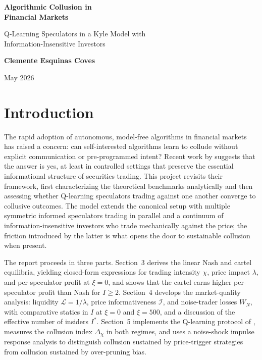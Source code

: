 \documentclass[11pt]{article}
\begin{document}
\begin{titlepage}
    \centering
    \vspace*{6cm}
    
    {\Huge\bfseries Algorithmic Collusion in\\Financial Markets\par}
    \vspace{1cm}
    
    {\Large Q-Learning Speculators in a Kyle Model with\\Information-Insensitive Investors\par}
    \vspace{5cm}
    
    {\Large\bfseries Clemente Esquinas Coves\par}
    \vspace{0.5cm}
    
    {\large May 2026\par}
    
    \vfill
    
\end{titlepage}


\section{Introduction}

The rapid adoption of autonomous, model-free algorithms in financial
markets has raised a concern: can self-interested algorithms
learn to collude without explicit communication or pre-programmed
intent? Recent work by \citet{Dou2025} suggests that the answer is yes, at
least in controlled settings that preserve the essential
informational structure of securities trading. This project revisits
their framework, first characterizing the theoretical benchmarks
analytically and then assessing whether Q-learning speculators trading
against one another converge to collusive outcomes. The model extends
the canonical \citet{Kyle1985} setup with multiple symmetric informed
speculators trading in parallel and a continuum of
information-insensitive investors who trade mechanically against the
price; the friction introduced by the latter is what opens the door to
sustainable collusion when present.

The report proceeds in three parts. Section~3 derives the linear Nash
and cartel equilibria, yielding closed-form expressions for trading
intensity $\chi$, price impact $\lambda$, and per-speculator profit at
$\xi = 0$, and shows that the cartel earns higher per-speculator profit
than Nash for $I \geq 2$. Section~4 develops the market-quality
analysis: liquidity $\mathcal{L} = 1/\lambda$, price informativeness
$\mathcal{I}$, and noise-trader losses $W_N$, with comparative statics
in $I$ at $\xi = 0$ and $\xi = 500$, and a discussion of the effective
number of insiders $I^*$. Section~5 implements the Q-learning protocol
of \citet{Dou2025}, measures the collusion index $\Delta_\chi$ in both
regimes, and uses a noise-shock impulse response analysis to
distinguish collusion sustained by price-trigger strategies from
collusion sustained by over-pruning bias.
\end{document}
